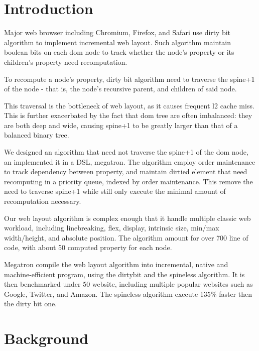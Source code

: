 \documentclass[format=acmsmall, review=false, screen=true]{acmart}
\begin{document}
\maketitle

\renewcommand{\shortauthors}{G. Zhou et al.}

\section{Introduction}

Major web browser including Chromium, Firefox, and Safari use dirty bit algorithm to implement incremental web layout. Such algorithm maintain boolean bits on each dom node to track whether the node's property or its children's property need recomputation.

To recompute a node's property, dirty bit algorithm need to traverse the spine+1 of the node - that is, the node's recursive parent, and children of said node. 

This traversal is the bottleneck of web layout, as it causes frequent l2 cache miss. This is further exacerbated by the fact that dom tree are often imbalanced: they are both deep and wide, causing spine+1 to be greatly larger than that of a balanced binary tree.

We designed an algorithm that need not traverse the spine+1 of the dom node, an implemented it in a DSL, megatron. The algorithm employ order maintenance to track dependency between property, and maintain dirtied element that need recomputing in a priority queue, indexed by order maintenance. This remove the need to traverse spine+1 while still only execute the minimal amount of recomputation necessary.

Our web layout algorithm is complex enough that it handle multiple classic web workload, including linebreaking, flex, display, intrinsic size, min/max width/height, and absolute position. The algorithm amount for over 700 line of code, with about 50 computed property for each node.

Megatron compile the web layout algorithm into incremental, native and machine-efficient program, using the dirtybit and the spineless algorithm. It is then benchmarked under 50 website, including multiple popular websites such as Google, Twitter, and Amazon. The spineless algorithm execute 135\% faster then the dirty bit one.
\section{Background}
\end{document}
